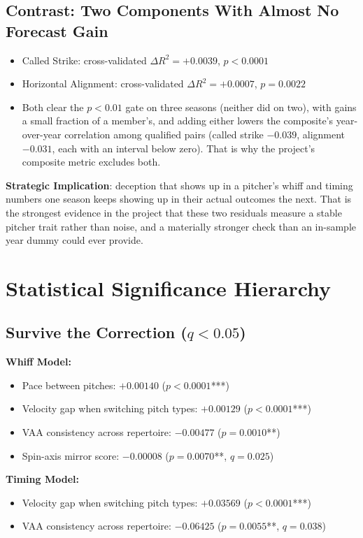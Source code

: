 \documentclass[11pt]{article}
\begin{document}
\subsection*{Contrast: Two Components With Almost No Forecast Gain}
\begin{itemize}
\item Called Strike: cross-validated $\Delta R^2 = +0.0039$, $p<0.0001$
\item Horizontal Alignment: cross-validated $\Delta R^2 = +0.0007$, $p=0.0022$
\item Both clear the $p<0.01$ gate on three seasons (neither did on two), with gains a small fraction of a member's, and adding either lowers the composite's year-over-year correlation among qualified pairs (called strike $-0.039$, alignment $-0.031$, each with an interval below zero). That is why the project's composite metric excludes both.
\end{itemize}

\textbf{Strategic Implication}: deception that shows up in a pitcher's whiff and timing numbers one season keeps showing up in their actual outcomes the next. That is the strongest evidence in the project that these two residuals measure a stable pitcher trait rather than noise, and a materially stronger check than an in-sample year dummy could ever provide.

\section*{Statistical Significance Hierarchy}

\subsection*{Survive the Correction ($q<0.05$)}

\textbf{Whiff Model:}
\begin{itemize}
\item Pace between pitches: $+0.00140$ ($p<0.0001$***)
\item Velocity gap when switching pitch types: $+0.00129$ ($p<0.0001$***)
\item VAA consistency across repertoire: $-0.00477$ ($p=0.0010$**)
\item Spin-axis mirror score: $-0.00008$ ($p=0.0070$**, $q=0.025$)
\end{itemize}

\textbf{Timing Model:}
\begin{itemize}
\item Velocity gap when switching pitch types: $+0.03569$ ($p<0.0001$***)
\item VAA consistency across repertoire: $-0.06425$ ($p=0.0055$**, $q=0.038$)
\end{itemize}
\end{document}
